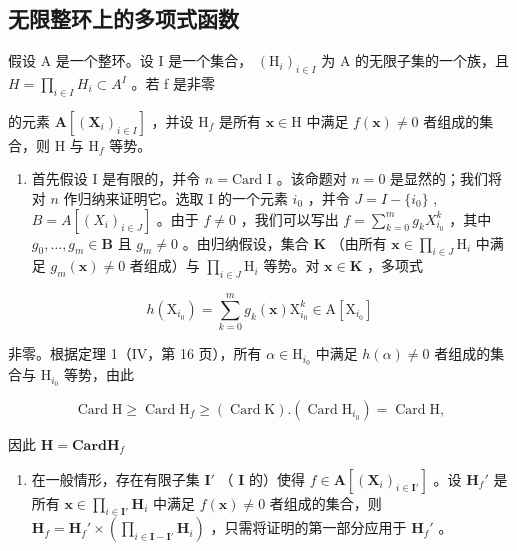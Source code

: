 \subsection{无限整环上的多项式函数}

假设 A 是一个整环。设 I 是一个集合， \((\mathrm{H}_{i})_{i\in I}\) 为 A 的无限子集的一个族，且 \(H=\prod_{i\in I}H_{i}\subset A^{I}\) 。若 f 是非零

的元素 \(\mathbf{A}[(\mathbf{X}_i)_{i\in I}]\) ，并设 \(\mathrm{H}_f\) 是所有 \(\mathbf{x}\in \mathrm{H}\) 中满足 \(f(\mathbf{x})\neq 0\) 者组成的集合，则 \(\mathrm{H}\) 与 \(\mathrm{H}_f\) 等势。

\begin{enumerate}
\def\labelenumi{\alph{enumi})}
\tightlist
\item
  首先假设 I 是有限的，并令 \(n = \text{Card I}\) 。该命题对 \(n = 0\) 是显然的；我们将对 \(n\) 作归纳来证明它。选取 I 的一个元素 \(i_0\) ，并令 \(J = I - \{i_0\}\) , \(B = A[(X_i)_{i \in J}]\) 。由于 \(f \neq 0\) ，我们可以写出 \(f = \sum_{k=0}^{m} g_k X_{i_0}^k\) ，其中 \(g_0, \ldots, g_m \in \mathbf{B}\) 且 \(g_m \neq 0\) 。由归纳假设，集合 \(\mathbf{K}\) （由所有 \(\mathbf{x} \in \prod_{i \in J} \mathrm{H}_i\) 中满足 \(g_m(\mathbf{x}) \neq 0\) 者组成）与 \(\prod_{i \in J} \mathrm{H}_i\) 等势。对 \(\mathbf{x} \in \mathbf{K}\) ，多项式
\end{enumerate}

\[
h \left(\mathrm{X} _ {i _ {0}}\right) = \sum_ {k = 0} ^ {m} g _ {k} (\mathbf {x}) \mathrm{X} _ {i _ {0}} ^ {k} \in \mathrm{A} \left[ \mathrm{X} _ {i _ {0}} \right]
\]

非零。根据定理 1（IV，第 16 页），所有 \(\alpha \in \mathrm{H}_{i_0}\) 中满足 \(h(\alpha) \neq 0\) 者组成的集合与 \(\mathrm{H}_{i_0}\) 等势，由此

\[
\operatorname{Card} \mathrm{H} \geqslant \operatorname{Card} \mathrm{H} _ {f} \geqslant (\operatorname{Card} \mathrm{K}). (\operatorname{Card} \mathrm{H} _ {i _ {0}}) = \operatorname{Card} \mathrm{H},
\]

因此 \(\mathbf{H} = \mathbf{Card}\mathbf{H}_f\)

\begin{enumerate}
\def\labelenumi{\alph{enumi})}
\setcounter{enumi}{1}
\tightlist
\item
  在一般情形，存在有限子集 \(\mathbf{I}'\) （ \(\mathbf{I}\) 的）使得 \(f \in \mathbf{A}[(\mathbf{X}_i)_{i \in \mathbf{I}'}]\) 。设 \(\mathbf{H}_f'\) 是所有 \(\mathbf{x} \in \prod_{i \in \mathbf{I}'} \mathbf{H}_i\) 中满足 \(f(\mathbf{x}) \neq 0\) 者组成的集合，则 \(\mathbf{H}_f = \mathbf{H}_f' \times \left( \prod_{i \in \mathbf{I} - \mathbf{I}'} \mathbf{H}_i \right)\) ，只需将证明的第一部分应用于 \(\mathbf{H}_f'\) 。
\end{enumerate}

